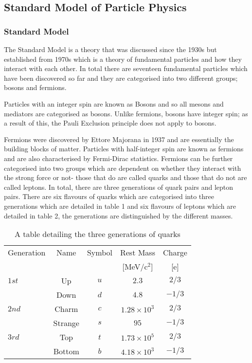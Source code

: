 \documentclass[12pt,a4paper]{article}
\begin{document}
\subsection{Standard Model of Particle Physics}
\label{Standard Model of Particle Physics}

\subsubsection{Standard Model}
\par
The Standard Model is a theory that was discussed since the 1930s but established from 1970s which is a theory of fundamental particles and how they interact with each other. In total there are seventeen fundamental particles which have been discovered so far and they are categorised into two different groups; bosons and fermions. \par

Particles with an integer spin are known as Bosons and so all mesons and mediators are categorised as bosons. Unlike fermions, bosons have integer spin; as a result of this, the Pauli Exclusion principle does not apply to bosons.\par 

Fermions were discovered by Ettore Majorana in 1937 and are essentially the building blocks of matter. Particles with half-integer spin are known as fermions and are also characterised by Fermi-Dirac statistics. Fermions can be further categorised into two groups which are dependent on whether they interact with the strong force or not- those that do are called quarks and those that do not are called leptons. In total, there are three generations of quark pairs and lepton pairs. There are six flavours of quarks which are categorised into three generations which are detailed in table 1 and six flavours of leptons which are detailed in table 2, the generations are distinguished by the different masses.

\par
 \begin{table}[!h]
  \centering
  \caption{A table detailing the three generations of quarks} 
  \label{table}
  
  \begin{tabular}{l|c|c|c|c}
  \hline
    Generation & Name & Symbol & Rest Mass & Charge \\
     &  &  &  [MeV/c$^2$] & [e] \\
    \hline
    $1st$ & Up & $u$ & $2.3$ & $2/3$ \\
    $ $ & Down & $d$ & $4.8$ & $-1/3$   \\
    \hline
    $2nd$ & Charm & $c$ & $1.28 \times 10^3$ & $2/3$ \\
    $ $ & Strange & $s$ & $95$ & $-1/3$ \\
    \hline
    $3rd$ & Top & $t$ & $1.73 \times 10^5 $ & $2/3$ \\
    $ $ & Bottom & $b$ & $4.18\times 10^3 $ & $-1/3$ \\

    \hline
  \end{tabular}
\end{table}
\end{document}
